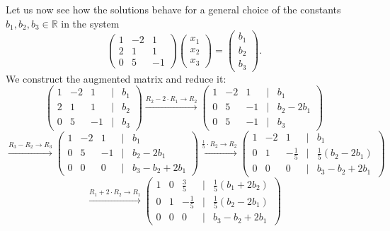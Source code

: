\begin{example}
\label{ex:consistency_conditions}
Let us now see how the solutions behave for a general choice of the constants $b_1, b_2, b_3 \in \mathbb{R}$ in the system
\[
\begin{pmatrix}
1 & -2 & 1 \\
2 & 1 & 1 \\
0 & 5 & -1
\end{pmatrix}
\begin{pmatrix} x_1 \\ x_2 \\ x_3 \end{pmatrix}
= \begin{pmatrix} b_1 \\ b_2 \\ b_3 \end{pmatrix}.
\]
We construct the augmented matrix and reduce it:
\[
\begin{pmatrix}
1 & -2 & 1 & \big| & b_1 \\
2 & 1 & 1 & \big| & b_2 \\
0 & 5 & -1 & \big| & b_3
\end{pmatrix}
\xrightarrow{R_2 - 2 \cdot R_1 \to R_2}
\begin{pmatrix}
1 & -2 & 1 & \big| & b_1 \\
0 & 5 & -1 & \big| & b_2 - 2b_1 \\
0 & 5 & -1 & \big| & b_3
\end{pmatrix}
\]
\[
\xrightarrow{R_3 - R_2 \to R_3}
\begin{pmatrix}
1 & -2 & 1 & \big| & b_1 \\
0 & 5 & -1 & \big| & b_2 - 2b_1 \\
0 & 0 & 0 & \big| & b_3 - b_2 + 2b_1
\end{pmatrix}
\xrightarrow{\frac{1}{5} \cdot R_2 \to R_2}
\begin{pmatrix}
1 & -2 & 1 & \big| & b_1 \\
0 & 1 & -\frac{1}{5} & \big| & \frac{1}{5}(b_2 - 2b_1) \\
0 & 0 & 0 & \big| & b_3 - b_2 + 2b_1
\end{pmatrix}
\]
\[
\xrightarrow{R_1 + 2 \cdot R_2 \to R_1}
\begin{pmatrix}
1 & 0 & \frac{3}{5} & \big| & \frac{1}{5}(b_1 + 2b_2) \\
0 & 1 & -\frac{1}{5} & \big| & \frac{1}{5}(b_2 - 2b_1) \\
0 & 0 & 0 & \big| & b_3 - b_2 + 2b_1
\end{pmatrix}
\]
\end{example}
